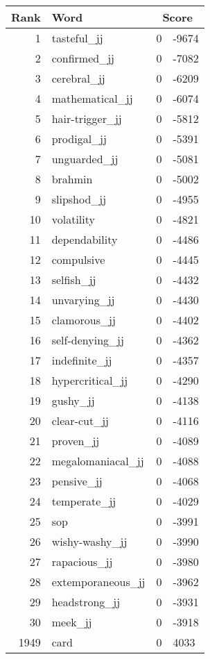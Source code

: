 \begin{longtable}[!htbp]{| rlr@{.}l |}
    \hline
    \textbf{Rank} & \textbf{Word} & \multicolumn{2}{c|}{\textbf{Score}} \\
    \hline
    \endhead
    1 & tasteful\_jj & 0 & -9674 \\
    2 & confirmed\_jj & 0 & -7082 \\
    3 & cerebral\_jj & 0 & -6209 \\
    4 & mathematical\_jj & 0 & -6074 \\
    5 & hair-trigger\_jj & 0 & -5812 \\
    6 & prodigal\_jj & 0 & -5391 \\
    7 & unguarded\_jj & 0 & -5081 \\
    8 & brahmin & 0 & -5002 \\
    9 & slipshod\_jj & 0 & -4955 \\
    10 & volatility & 0 & -4821 \\
    11 & dependability & 0 & -4486 \\
    12 & compulsive & 0 & -4445 \\
    13 & selfish\_jj & 0 & -4432 \\
    14 & unvarying\_jj & 0 & -4430 \\
    15 & clamorous\_jj & 0 & -4402 \\
    16 & self-denying\_jj & 0 & -4362 \\
    17 & indefinite\_jj & 0 & -4357 \\
    18 & hypercritical\_jj & 0 & -4290 \\
    19 & gushy\_jj & 0 & -4138 \\
    20 & clear-cut\_jj & 0 & -4116 \\
    21 & proven\_jj & 0 & -4089 \\
    22 & megalomaniacal\_jj & 0 & -4088 \\
    23 & pensive\_jj & 0 & -4068 \\
    24 & temperate\_jj & 0 & -4029 \\
    25 & sop & 0 & -3991 \\
    26 & wishy-washy\_jj & 0 & -3990 \\
    27 & rapacious\_jj & 0 & -3980 \\
    28 & extemporaneous\_jj & 0 & -3962 \\
    29 & headstrong\_jj & 0 & -3931 \\
    30 & meek\_jj & 0 & -3918 \\
    1949 & card & 0 & 4033 \\

\end{longtable}
